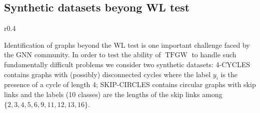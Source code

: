 \documentclass{article}
\newcommand{\TFGW}{\operatorname{TFGW}}
\begin{document}
\subsection{Synthetic datasets beyong WL test \label{sec:beyondWL}}
\begin{wraptable}{r}{0.4\textwidth} 
	\vspace{-5mm}
	\caption{Average accuracy on synthetic datasets (10 simulations). } \label{tab:toy}
	\begin{center}
	\end{center}
\end{wraptable}

Identification of graphs beyond the WL test is one important
challenge faced by the GNN community. In order to test the ability of $\TFGW$ to handle
such fundamentally difficult problems we consider two synthetic datasets:
4-CYCLES \cite{loukas2019graph, papp2021dropgnn} contains graphs with
(possibly) disconnected cycles where the label $y_i$ is the presence of a cycle of
length 4; SKIP-CIRCLES \cite{chen2019equivalence} contains circular graphs with
skip links and the labels (10 classes) are the lengths of the skip links among $\{2, 3, 4, 5, 6,
9, 11, 12, 13, 16\}$. 
\end{document}
